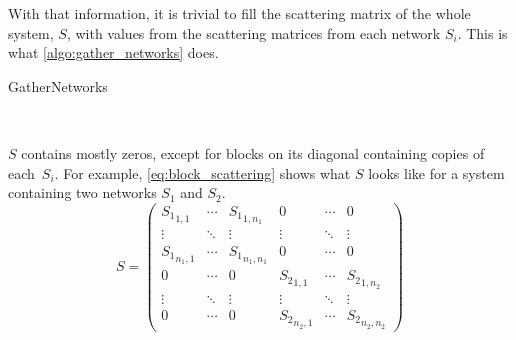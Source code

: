 With that information, it is trivial to fill the scattering matrix of the whole system, $S$, with values from the scattering matrices from each network $S_i$.
This is what \cref{algo:gather_networks} does.
\begin{algorithm}
    \caption{GatherNetworks}
    \label{algo:gather_networks}
    \begin{algorithmic}
         
         
        \State{}
                
        \EndFor
        \State{}
        \State{}
         
        \EndFor
        \\ 
        \EndFunction
    \end{algorithmic}
\end{algorithm}
$S$ contains mostly zeros, except for blocks on its diagonal containing copies of each~$S_i$.
For example, \cref{eq:block_scattering} shows what $S$ looks like for a system containing two networks $S_1$ and $S_2$.
\begin{equation}
    S =
    \begin{pmatrix}
        {S_1}_{1, 1} & \cdots & {S_1}_{1, n_1} &
        0 & \cdots & 0
        \\
        \vdots & \ddots &\vdots &
        \vdots & \ddots &\vdots 
        \\
        {S_1}_{n_1, 1} & \cdots & {S_1}_{n_1, n_1} &
        0 & \cdots & 0
        \\
        0 & \cdots & 0 &
        {S_2}_{1, 1} & \cdots & {S_2}_{1, n_2}
        \\
        \vdots & \ddots &\vdots &
        \vdots & \ddots &\vdots
        \\
        0 & \cdots & 0 &
        {S_2}_{n_2, 1} & \cdots & {S_2}_{n_2, n_2}
    \end{pmatrix}
    \label{eq:block_scattering}
\end{equation}


